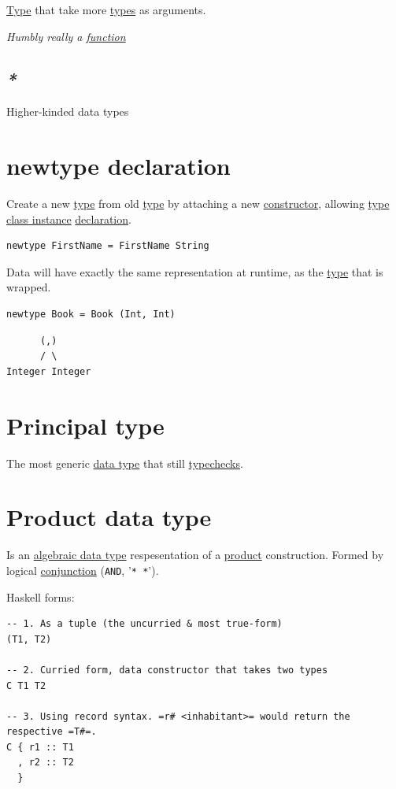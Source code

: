 \documentclass[a4paper,14pt,oneside]{book}
\begin{document}
\hyperref[orgde40363]{Type} that take more \hyperref[org91cf53a]{types} as arguments.

\emph{Humbly really a \hyperref[orgc39a15c]{function}}

\subsection{\emph{*}}
\label{sec:org662d527}

\label{org0d71ab0}Higher-kinded data types

\section{\label{orgbf5c2d3}newtype declaration}
\label{sec:orgdd3315f}
Create a new \hyperref[orgde40363]{type} from old \hyperref[orgde40363]{type} by attaching a new \hyperref[org93e13b6]{constructor}, allowing \hyperref[orgf345504]{type class instance} \hyperref[org648d60c]{declaration}.
\begin{verbatim}
newtype FirstName = FirstName String
\end{verbatim}

Data will have exactly the same representation at runtime, as the \hyperref[orgde40363]{type} that is wrapped.

\begin{verbatim}
newtype Book = Book (Int, Int)
\end{verbatim}
\begin{verbatim}
      (,)
      / \
Integer Integer
\end{verbatim}

\section{\label{org1e3ed64}Principal type}
\label{sec:org8ac6306}
The most generic \hyperref[org89def2c]{data type} that still \hyperref[orgc428238]{typechecks}.

\section{\label{org1fefe48}Product data type}
\label{sec:orgffbc55d}
Is an \hyperref[org65222de]{algebraic data type} respesentation of a \hyperref[org917411a]{product} construction.
Formed by logical \hyperref[org55068cf]{conjunction} (\texttt{AND}, '\texttt{* *}').

Haskell forms:
\begin{verbatim}
-- 1. As a tuple (the uncurried & most true-form)
(T1, T2)

-- 2. Curried form, data constructor that takes two types
C T1 T2

-- 3. Using record syntax. =r# <inhabitant>= would return the respective =T#=.
C { r1 :: T1
  , r2 :: T2
  }
\end{verbatim}
\end{document}
